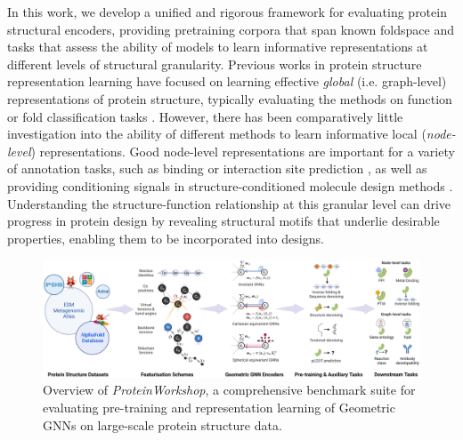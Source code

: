 In this work, we develop a unified and rigorous framework for evaluating protein structural encoders, providing pretraining corpora that span known foldspace and tasks that assess the ability of models to learn informative representations at different levels of structural granularity. Previous works in protein structure representation learning have focused on learning effective \emph{global} (i.e. graph-level) representations of protein structure, typically evaluating the methods on function or fold classification tasks \citep{Gligorijevi2021, zhang2023protein}. However, there has been comparatively little investigation into the ability of different methods to learn informative local (\emph{node-level}) representations. Good node-level representations are important for a variety of annotation tasks, such as binding or interaction site prediction \citep{gainza2020deciphering}, as well as providing conditioning signals in structure-conditioned molecule design methods \citep{schneuing2022structure, corso2023diffdock}. Understanding the structure-function relationship at this granular level can drive progress in protein design by revealing structural motifs that underlie desirable properties, enabling them to be incorporated into designs.

\begin{figure}[t!]
    \centering
    \includegraphics[width=1\textwidth]{iclr_2024/proteinworkshop.jpeg}
    \caption{
    Overview of \emph{ProteinWorkshop}, a comprehensive benchmark suite for evaluating pre-training and representation learning of Geometric GNNs on large-scale protein structure data.
    }
    \label{fig:overview}
\end{figure}


